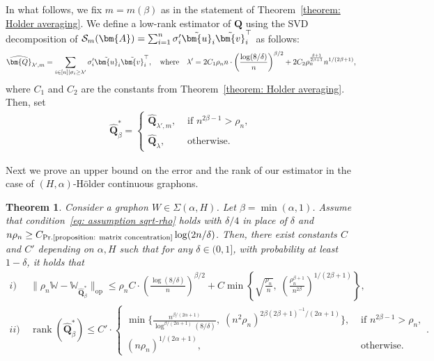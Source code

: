 \documentclass[11pt]{article}
\newcommand{\bA}{\bm{A}}
\newcommand{\bQ}{\bm{Q}}
\newcommand{\bQhat}{\widehat{\bm{Q}}}
\newcommand{\bu}{\bm{u}}
\newcommand{\bv}{\bm{v}}
\newcommand{\opnorm}[1]{\|#1\|_{\mathrm{op}}}
\newcommand{\bbW}{\mathbb{W}}
\newcommand{\constantBandeira}{C_{\text{Pr.\ref{proposition: matrix concentration}}}}
\newcommand{\<}{\langle}
\renewcommand{\>}{\rangle}
\newcommand{\cS}{\mathcal{S}}
\DeclareMathOperator{\rank}{rank}
\theoremstyle{plain}
\newtheorem{theorem}{Theorem}
\theoremstyle{definition}
\theoremstyle{remark}
\begin{document}
{In what follows, we fix $m = m(\beta)$ as in the statement of Theorem~\ref{theorem: Holder averaging}. We define a low-rank estimator of $\bQ$ using the SVD decomposition of $\cS_m(\bA) = \sum_{i = 1}^n \sigma_i' \tilde \bu_i \tilde \bv_i^\top$ as follows:
\begin{align*}
    \widehat{\bQ}_{\lambda', m} = \sum_{i\in [n] \mid \sigma_i \ge \lambda'} \sigma_i' \tilde \bu_i \tilde \bv_i^\top, \quad \text{where} \quad \lambda' = 2C_1 \rho_n n \cdot \left ( \frac{\log(8/\delta)}{n} \right )^{\beta/2}  + 2C_2\rho_n^{\frac{\beta + 1}{2 \beta + 1}} n^{1/(2 \beta + 1)},
\end{align*}
where $C_1$ and $C_2$ are the constants from Theorem~\ref{theorem: Holder averaging}. Then, set
\begin{align*}
    \widehat{\bQ}^*_{\beta} = \begin{cases}
        \widehat{\bQ}_{\lambda', m}, & \text{ if } n^{2 \beta - 1} > \rho_n, \\
        \widehat{\bQ}_{\lambda}, & \text{ otherwise.}
    \end{cases}
\end{align*}
}


Next we prove an upper bound on the error and the rank of our estimator in the case of  $(H, \alpha)$-H\"older continuous graphons.

\begin{theorem}
\label{theorem: holder convergence rate}
Consider a graphon $W\in \Sigma (\alpha, H)$. Let $\beta = \min(\alpha, 1)$. Assume that 
    condition~\eqref{eq: assumption sqrt-rho} holds with $\delta/4$ in place of $\delta$ and $n \rho_n \ge \constantBandeira \log (2 n/\delta)$. Then, there exist constants $C$ and $C'$ depending on $\alpha, H$ such that for any $\delta \in (0,1]$, with probability at least $1 - \delta$, it holds that
	\begin{align*}
		i)&\ \opnorm{\rho_n \bbW - \bbW_{\bQhat^*_{\beta}}} \le \rho_n  C \cdot \left ( \frac{\log (8 /\delta)}{n} \right )^{\beta/2} + C \min \left \{\sqrt{\frac{\rho_n}{n}}, \; \left ( \frac{\rho_n^{\beta + 1}}{n^{2 \beta}} \right )^{1/(2 \beta + 1)} \right \}, \\
		ii)&\  \rank (\bQhat_{\beta}^*)  \le C' \cdot \begin{cases}
            \min \Big \{\frac{n^{\beta/(2 \alpha + 1)}}{\log^{\beta/(2 \alpha + 1)}(8/\delta)}, \; (n^2 \rho_n)^{2\beta (2 \beta + 1)^{-1} / (2\alpha + 1)} \Big \}, & \text{ if } n^{2 \beta - 1} > \rho_n, \\
            (n \rho_n)^{1/(2 \alpha + 1)}, & \text{ otherwise.}
        \end{cases}. 
	\end{align*}
\end{theorem}
\end{document}
